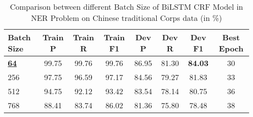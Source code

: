 \begin{table*}[htbp!]
    \centering
    \begin{tabular}{lccccccc}
    \midrule
    Batch Size  &  Train P          & Train R        & Train F1       & Dev P      & Dev R & Dev F1 & Best Epoch\\
    \midrule
    \underline{\bf64}& 99.75   & 99.76   & 99.76    & 86.95 & 81.30 & \bf84.03  & 30         \\
    256        & 97.75   & 96.59   & 97.17    & 84.56 & 79.27 & 81.83     & 33         \\
    512        & 94.75   & 92.12   & 93.42    & 83.54 & 78.14 & 80.75     & 36         \\
    768        & 88.41   & 83.74   & 86.02    & 81.36 & 75.80 & 78.48     & 38         \\

    \bottomrule
    \end{tabular}
\caption{Comparison between different Batch Size of BiLSTM CRF Model in NER Problem on Chinese traditional Corps data (in \%)}
\label{tab:batchSize2}
\end{table*}
